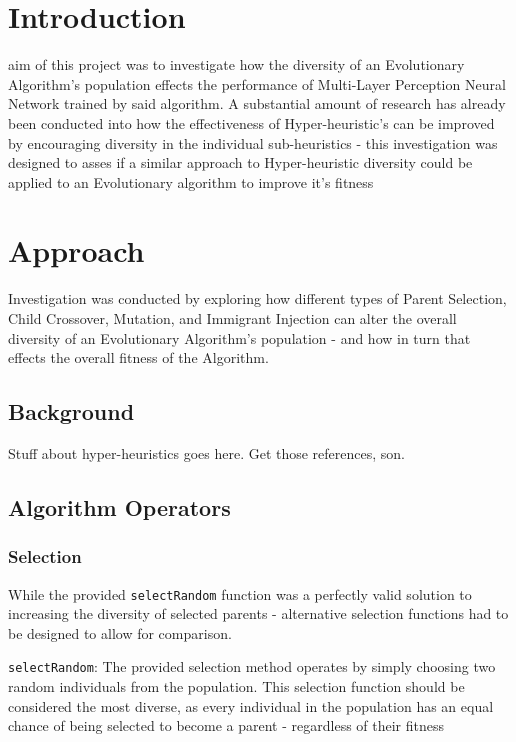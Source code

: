 \section{Introduction}
	 aim of this project was to investigate how the diversity of an Evolutionary Algorithm's population effects the performance of Multi-Layer Perception Neural Network trained by said algorithm. 
	A substantial amount of research has already been conducted into how the effectiveness of Hyper-heuristic's can be improved by encouraging diversity in the individual sub-heuristics - this investigation was designed to asses if a similar approach to Hyper-heuristic diversity could be applied to an Evolutionary algorithm to improve it's fitness
	
\section{Approach}
	Investigation was conducted by exploring how different types of Parent Selection, Child Crossover, Mutation, and Immigrant Injection can alter the overall diversity of an Evolutionary Algorithm's population - and how in turn that effects the overall fitness of the Algorithm.
	
	\subsection{Background}
		Stuff about hyper-heuristics goes here. Get those references, son.
		\cite{Hong16112004} \cite{hart2017constructing}
	
	\subsection{Algorithm Operators}
		\subsubsection{Selection}
			While the provided \texttt{selectRandom} function was a perfectly valid solution to increasing the diversity of selected parents - alternative selection functions had to be designed to allow for comparison.
			
			\texttt{selectRandom}: The provided selection method operates by simply choosing two random individuals from the population. This selection function should be considered the most diverse, as every individual in the population has an equal chance of being selected to become a parent - regardless of their fitness
	
